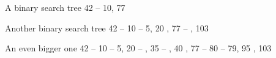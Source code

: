\documentclass{scrartcl}
\begin{document}
\begin{listingbox}{A binary search tree}
     { 42 -- { 10, 77 } }
\end{listingbox}

\begin{listingbox}{Another binary search tree}
  { 42 -- {
      10 -- { 5, 20 }, 
      77 -- { , 103} 
    }
  }
\end{listingbox}

\begin{listingbox}{An even bigger one}
  { 42 --
    { 10 -- 
      { 5, 
        20 --
        { , 
          35 -- 
          { , 
            40 
          } 
        }
      },
      77 -- 
      { 80 -- 
        { 79, 95 }, 
        103
      }
    }
  }
\end{listingbox}
\end{document}
